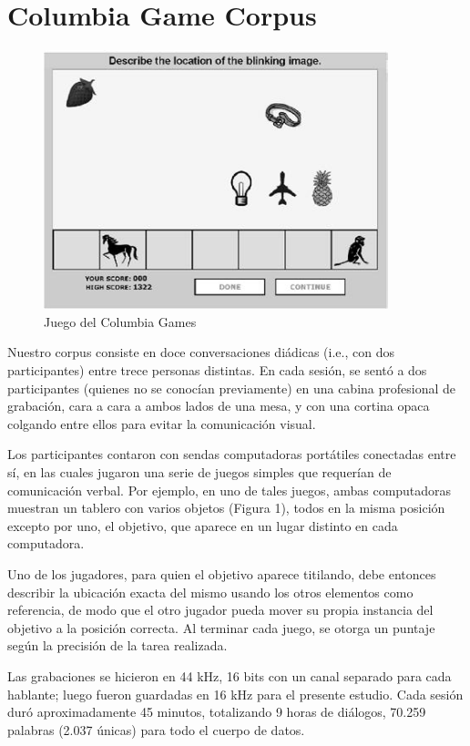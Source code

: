 \section{Columbia Game Corpus}

\begin{figure}
\centering
\includegraphics[width=10cm]{images/columbia_games.jpg}
\caption{Juego del Columbia Games}
\end{figure}

Nuestro corpus consiste en doce conversaciones diádicas (i.e., con dos participantes) entre trece personas distintas. En cada sesión, se sentó a dos participantes (quienes no se conocían previamente) en una cabina profesional de grabación, cara a cara a ambos lados de una mesa, y con una cortina opaca colgando entre ellos para evitar la comunicación visual.

Los participantes contaron con sendas computadoras portátiles conectadas entre sí, en las cuales jugaron una serie de juegos simples que requerían de comunicación verbal. Por ejemplo, en uno de tales juegos, ambas computadoras muestran un tablero con varios objetos (Figura 1), todos en la misma posición excepto por uno, el objetivo, que aparece en un lugar distinto en cada computadora.

Uno de los jugadores, para quien el objetivo aparece titilando, debe entonces describir la ubicación exacta del mismo usando los
otros elementos como referencia, de modo que el otro jugador pueda mover su propia instancia del objetivo a la posición correcta. Al terminar cada juego, se otorga un puntaje según la precisión de la tarea realizada.

Las grabaciones se hicieron en 44 kHz, 16 bits con un canal separado para cada hablante; luego fueron guardadas en 16 kHz para el presente estudio. Cada sesión duró aproximadamente 45 minutos, totalizando 9 horas de diálogos, 70.259 palabras (2.037 únicas) para todo el cuerpo de datos.

